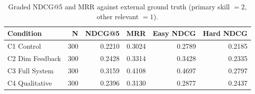 \begin{table}[htbp]
\centering
\caption{Graded NDCG@5 and MRR against external ground truth (primary skill $=2$, other relevant $=1$).}
\label{tab:graded-gt}
\begin{tabular}{lrrrrr}
\toprule
Condition & N & NDCG@5 & MRR & Easy NDCG & Hard NDCG \\
\midrule
  C1 Control & 300 & 0.2210 & 0.3024 & 0.2789 & 0.2185 \\
  C2 Dim Feedback & 300 & 0.2428 & 0.3314 & 0.3428 & 0.2335 \\
  C3 Full System & 300 & 0.3159 & 0.4108 & 0.4697 & 0.2797 \\
  C4 Qualitative & 300 & 0.2396 & 0.3130 & 0.2877 & 0.2437 \\
\bottomrule
\end{tabular}
\end{table}